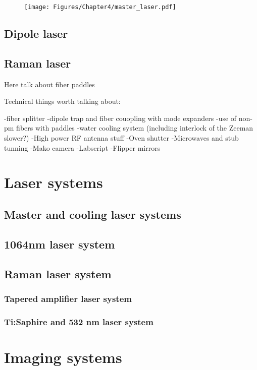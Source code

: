 \begin{figure}[htb]
\begin{center}
\texttt{[image: Figures/Chapter4/master\_laser.pdf]}
\caption[Water cooling manifold schematic]{}
\label{fig:master_laser}
\end{center}
\end{figure}

\subsection{Dipole laser}

\subsection{Raman laser}
Here talk about fiber paddles


Technical things worth talking about:

-fiber splitter
-dipole trap and fiber couopling with mode expanders
-use of non-pm fibers with paddles
-water cooling system (including interlock of the Zeeman slower?)
-High power RF antenna stuff
-Oven shutter
-Microwaves and stub tunning
-Mako camera
-Labscript
-Flipper mirrors


\section{Laser systems}
\subsection{Master and cooling laser systems}
\subsection{1064nm laser system}
\subsection{Raman laser system}
\subsubsection{Tapered amplifier laser system}
\subsubsection{Ti:Saphire and 532 nm laser system}

\section{Imaging systems}
